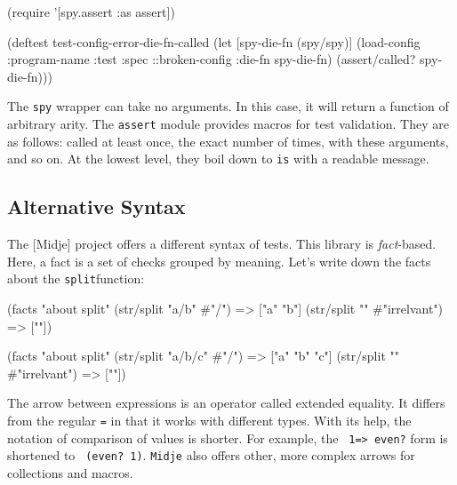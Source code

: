 \begin{english}
  \begin{clojure}
(require '[spy.assert :as assert])

(deftest test-config-error-die-fn-called
  (let [spy-die-fn (spy/spy)]
    (load-config {:program-name :test
                  :spec ::broken-config
                  :die-fn spy-die-fn})
    (assert/called? spy-die-fn)))
  \end{clojure}
\end{english}

The \verb|spy| wrapper can take no arguments. In this case, it will return a function of arbitrary arity. The \verb|assert| module provides macros for test validation. They are as follows: called at least once, the exact number of times, with these arguments, and so on. At the lowest level, they boil down to \verb|is| with a readable message.

\subsection{Alternative Syntax}


The [Midje] project offers a different syntax of tests. This library is \emph{fact}-based. Here, a fact is a set of checks grouped by meaning. Let's write down the facts about the \verb|split|function:

\ifx\DEVICETYPE\MOBILE

\begin{english}
  \begin{clojure}
(facts "about split"
 (str/split "a/b" #"/") => ["a" "b"]
 (str/split "" #"irrelvant") => [""])
  \end{clojure}
\end{english}

\else

\begin{english}
  \begin{clojure}
(facts "about split"
 (str/split "a/b/c" #"/") => ["a" "b" "c"]
 (str/split "" #"irrelvant") => [""])
  \end{clojure}
\end{english}

\fi


The arrow between expressions is an operator called extended equality. It differs from the regular \verb|=| in that it works with different types. With its help, the notation of comparison of values is shorter. For example, the \verb| 1=> even?| form is shortened to \verb| (even? 1)|. \verb|Midje| also offers other, more complex arrows for collections and macros.

